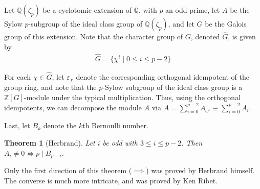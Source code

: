 \documentclass[12pt]{article}
\newtheorem{Theo}{Theorem}
\newcommand{\mb}{\mathbb}
\newcommand{\Q}{\mb{Q}}
\newcommand{\<}{\langle}
\renewcommand{\>}{\rangle}
\begin{document}
Let $\mb{Q}(\zeta_p)$ be a cyclotomic extension of $\Q$, with $p$ an odd prime, let $A$ be the Sylow $p$-subgroup of the ideal class group of $\mb{Q}(\zeta_p)$, and let $G$ be the Galois group of this extension.  Note that the character  group of $G$, denoted $\hat{G}$, is given by
\begin{align*}
\hat{G}=\{\chi^i\mid0\leq i\leq p-2\}
\end{align*}

For each $\chi\in\hat{G}$, let $\varepsilon_\chi$ denote the corresponding orthogonal idempotent of the group ring, and note that the $p$-Sylow subgroup of the ideal class group is a $\mathbb{Z}[G]$-module under the typical multiplication.  Thus, using the orthogonal idempotents, we can decompose the module $A$ via $A=\sum_{i=0}^{p-2}A_{\omega^i}\equiv\sum_{i=0}^{p-2}A_i$.

Last, let $B_k$ denote the $k$th Bernoulli number.

\begin{Theo}[Herbrand]
Let $i$ be odd with $3\leq i\leq p-2$.  Then $A_i\neq 0 \iff p\mid B_{p-i}$.
\end{Theo}

Only the first direction of this theorem ($\implies$) was proved by Herbrand himself.  The converse is much more intricate, and was proved by Ken Ribet.
\end{document}
